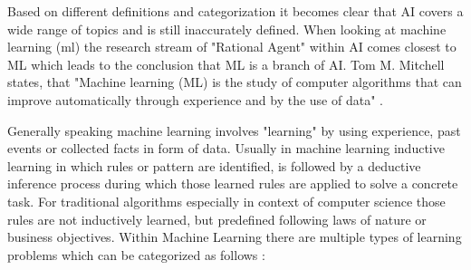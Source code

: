 \documentclass[../main.tex]{subfiles}
\begin{document}
Based on different definitions and categorization it becomes clear that AI covers a wide range of topics and is still inaccurately defined. When looking at machine learning (\acs{ml}) the research stream of "Rational Agent" within AI comes closest to ML which leads to the conclusion that ML is a branch of AI. Tom M. Mitchell states, that "Machine learning (ML) is the study of computer algorithms that can improve automatically through experience and by the use of data" \cite{mitchell_machine_1997}.
\newline

Generally speaking machine learning involves "learning" by using experience, past events or collected facts in form of data. Usually in machine learning inductive learning in which rules or pattern are identified, is followed by a deductive inference process during which those learned rules are applied to solve a concrete task. For traditional algorithms especially in context of computer science those rules are not inductively learned, but predefined following laws of nature or business objectives. Within Machine Learning there are multiple types of learning problems which can be categorized as follows \cite{brownlee_14_2019}:
\end{document}
